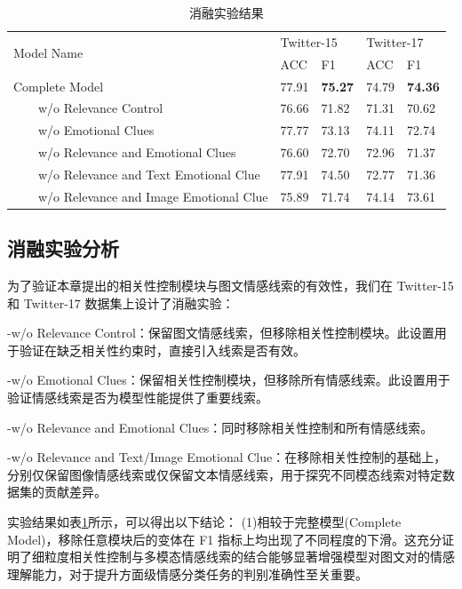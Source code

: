 \begin{table}[htbp]
  \centering
    \caption{消融实验结果}
    \label{second:Ablation}
\begin{tabular}{lllll}
\toprule
\multirow{2}{*}{Model Name} & \multicolumn{2}{l}{Twitter-15} & \multicolumn{2}{l}{Twitter-17} \\
                            & ACC            & F1             & ACC             & F1            \\
    \hline
Complete Model              & 77.91          & \textbf{75.27}          & 74.79         & \textbf{74.36}       \\
~~~~w/o Relevance Control    & 76.66          & 71.82          & 71.31          & 70.62        \\
~~~~w/o Emotional Clues  & 77.77               & 73.13              & 74.11               & 72.74 \\
~~~~w/o Relevance and  Emotional Clues & 76.60 & 72.70 & 72.96 & 71.37  \\
~~~~w/o Relevance and Text Emotional Clue & 77.91  & 74.50     & 72.77           & 71.36  \\
~~~~w/o Relevance and Image Emotional Clue  & 75.89     & 71.74    & 74.14           & 73.61         \\

\bottomrule
\end{tabular}
\end{table}
\subsection{消融实验分析}

为了验证本章提出的相关性控制模块与图文情感线索的有效性，我们在 Twitter-15 和 Twitter-17 数据集上设计了消融实验：

-w/o Relevance Control：保留图文情感线索，但移除相关性控制模块。此设置用于验证在缺乏相关性约束时，直接引入线索是否有效。

-w/o Emotional Clues：保留相关性控制模块，但移除所有情感线索。此设置用于验证情感线索是否为模型性能提供了重要线索。

-w/o Relevance and  Emotional Clues：同时移除相关性控制和所有情感线索。

-w/o Relevance and Text/Image Emotional Clue：在移除相关性控制的基础上，分别仅保留图像情感线索或仅保留文本情感线索，用于探究不同模态线索对特定数据集的贡献差异。

实验结果如表\ref{second:Ablation}所示，可以得出以下结论：
(1)相较于完整模型(Complete Model)，移除任意模块后的变体在 F1 指标上均出现了不同程度的下滑。这充分证明了细粒度相关性控制与多模态情感线索的结合能够显著增强模型对图文对的情感理解能力，对于提升方面级情感分类任务的判别准确性至关重要。

